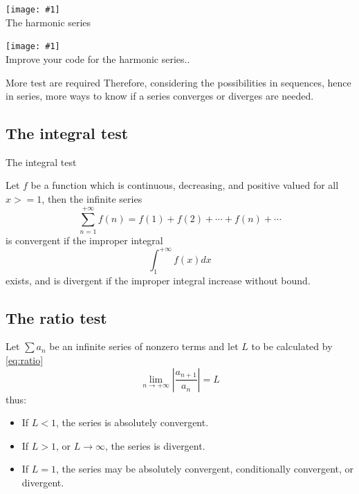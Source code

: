 \documentclass[newPxFont]{beamer}
\newcommand \imageFrame[2]{
\begingroup
\begin{frame}
  \begin{center}
\texttt{[image: \#1]}\\
\Large #2
    \end{center}
\end{frame}
\endgroup
}
\begin{document}
\imageFrame{harmonic}{The harmonic series}
\imageFrame{exer1}{Improve your code for the harmonic series..}
\begin{frame}{More test are required}
Therefore, considering the possibilities in sequences, hence in series, more ways to know if a series  \alert{converges} or \alert{diverges} are needed.
\end{frame}
\subsection{The integral test}
\begin{frame}{The integral test}
\begin{theorem}
    Let $f$ be a function which is continuous, decreasing, and positive valued for all $x>=1$, then the infinite series
    \begin{equation*}
      \sum_{n=1}^{+\infty} f(n)=f(1)+f(2)+\cdots+f(n)+\cdots
    \end{equation*}
    is \alert{convergent} if the improper integral
    \begin{equation*}
      \int_1^{+\infty} f(x)dx
    \end{equation*}
    exists, and is \alert{divergent} if the improper integral increase without bound.
  \end{theorem}
\end{frame}
\subsection{The ratio test}
\begin{frame}
  \begin{theorem}
    Let $\sum a_n$ be an infinite series of nonzero terms and let $L$ to be calculated by \eqref{eq:ratio}
    \begin{equation}
        \lim_{n\to+\infty} \left|\frac{a_{n+1}}{a_n}\right|=L\label{eq:ratio}
      \end{equation}
thus:
\pause
    \begin{itemize}
      \item If $L<1$, the series is absolutely convergent. \pause
      \item If $L>1$, or $L\to\infty$, the series is divergent. \pause
      \item If $L=1$, the series may be absolutely convergent, conditionally convergent, or divergent.
    \end{itemize}
        \end{theorem}
\end{frame}
\end{document}
